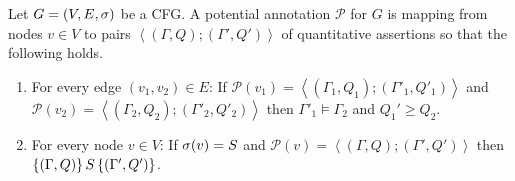 \documentclass[letterpaper,11pt]{article}
\begin{document}
Let $G = (V,E,\sigma)$ be a CFG. A potential annotation $\mathcal{P}$
for $G$ is mapping from nodes $v \in V$ to pairs
$\left<(\Gamma,Q);(\Gamma',Q')\right>$ of quantitative assertions so
that the following holds.
%
\begin{enumerate}
\item  For every edge $(v_1,v_2) \in E$: 
  If $\mathcal{P}(v_1) = \left<(\Gamma_1,Q_1);(\Gamma'_1,Q'_1)\right>$ and 
   $\mathcal{P}(v_2) = \left<(\Gamma_2,Q_2);(\Gamma'_2,Q'_2)\right>$ then
   $\Gamma'_1 \models \Gamma_2$ and $Q_1' \geq Q_2$.
 \item For every node $v \in V$: If $\sigma(v) = S$ and
   $\mathcal{P}(v) = \left<(\Gamma,Q);(\Gamma',Q')\right>$ then
  $\{(\Gamma,Q)\}\, S\, \{(\Gamma',Q')\}$.
\end{enumerate}



\end{document}
